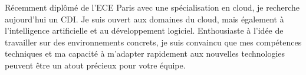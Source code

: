 

\begin{cvparagraph}

    Récemment diplômé de l’ECE Paris avec une spécialisation en cloud, je recherche aujourd'hui un CDI\@.
    Je suis ouvert aux domaines du cloud, mais également à l'intelligence artificielle et au développement logiciel.
    Enthousiaste à l’idée de travailler sur des environnements concrets, je suis convaincu que mes compétences
    techniques et ma capacité à m’adapter rapidement aux nouvelles technologies peuvent être un atout précieux
    pour votre équipe.

\end{cvparagraph}

